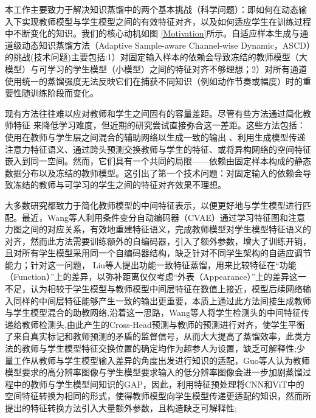 \documentclass[10.5pt,letterpaper]{article}
\begin{document}
本工作主要致力于解决知识蒸馏中的两个基本挑战（科学问题）：即如何在动态输入下实现教师模型与学生模型之间的有效特征对齐，以及如何适应学生在训练过程中不断变化的知识。我们的核心动机如图 \ref{Motivation}所示。自适应样本生成与通道级动态知识蒸馏方法（Adaptive Sample-aware Channel-wise Dynamic，ASCD）的挑战(技术问题)主要包括:1）对固定输入样本的依赖会导致冻结的教师模型（大模型）与可学习的学生模型（小模型）之间的特征对齐不够理想；2）对所有通道使用统一的蒸馏强度无法反映它们在捕获不同知识（例如动作节奏或幅度）时的重要性随训练阶段而变化。


现有方法往往难以应对教师和学生之间固有的容量差距。尽管有些方法通过简化教师特征 \cite{wang-nips2020-fusion}\cite{shu-iccv2021-channelkd} 来降低学习难度，但近期的研究尝试直接弥合这一差距。这些方法包括：使用在教师与学生层之间混合的辅助网络以生成一致的输出 \cite{liu-iclr2023-fkd}、利用生成模型传递注意力特征语义\cite{wang-aaai2024-gkd}、通过跨头预测交换教师与学生的特征\cite{liu-iclr2023-fkd}、或将异构网络的空间特征嵌入到同一空间\cite{wang-cvpr2024-crosskd}。然而，它们具有一个共同的局限——依赖由固定样本构成的静态数据分布以及冻结的教师模型。这引出了第一个技术问题：对固定输入的依赖会导致冻结的教师与可学习的学生之间的特征对齐效果不理想。

大多数研究\cite{wang-nips2020-fusion}\cite{shu-iccv2021-channelkd}都致力于简化教师模型的中间特征表示，以便更好地与学生模型进行匹配。最近，Wang等人\cite{wang-aaai2024-gkd}利用条件变分自动编码器（CVAE）通过学习特征图和注意力图之间的对应关系，有效地重建特征语义，完成教师模型对学生模型特征语义的对齐，然而此方法需要训练额外的自编码器，引入了额外参数，增大了训练开销，且对所有学生模型采用同一个自编码器结构，缺乏针对不同学生架构的自适应调节能力；针对这一问题，	Liu等人\cite{liu-iclr2023-fkd}提出功能一致特征蒸馏，用来比较特征在“功能（Function）”上的差异，以弥补距离仅仅考虑“外表（Appearance）”上的差异这一不足，认为相较于学生模型与教师模型中间层特征在数值上接近，模型后续网络输入同样的中间层特征能够产生一致的输出更重要，本质上通过此方法间接生成教师与学生模型混合的助教网络,沿着这一思路，Wang等人\cite{wang-cvpr2024-crosskd}将学生检测头的中间特征传递给教师检测头,由此产生的Cross-Head预测与教师的预测进行对齐，使学生平衡了来自真实标记和教师预测的矛盾的监督信号，从而大大提高了蒸馏效率，此类方法的教师与学生模型特征交换位置的确定均作为超参人为设置，缺乏可解释性;少量工作\cite{guo-tpami2024-pixelkd}从教师与学生模型输入差异的角度出发进行知识的适配，Guo等人\cite{guo-tpami2024-pixelkd}认为教师模型要求的高分辨率图像与学生模型要求输入的低分辨率图像会进一步加剧蒸馏过程中的教师与学生模型间知识的GAP，因此，利用特征预处理将CNN和ViT中的空间特征转换为相同的形式，使得教师模型向学生模型传递更适配的知识，然而所提出的特征转换方法引入大量额外参数，且构造缺乏可解释性;
\end{document}
